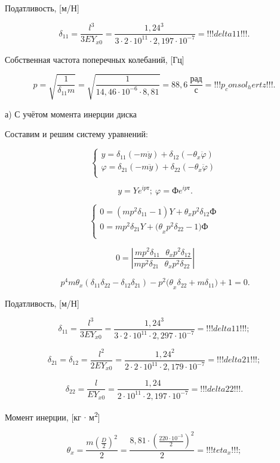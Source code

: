 Податливость, [м/Н]

\[\delta_{11} = \frac{l^{3}}{3EY_{x0}} = \frac{{1,24}^{3}\ }{3\cdot2\cdot10^{11}\cdot2,197\cdot10^{- 7}} = !!!delta11!!!.\ \]

Собственная частота поперечных колебаний, [Гц]

\[p = \sqrt{\frac{1}{\delta_{11}m}} = \sqrt{\frac{1}{14,46\cdot10^{- 6}\cdot8,81}} = 88,6\ \frac{рад}{с} = !!!p_consol_hertz!!!.\ \]

а) С учётом момента инерции диска

Составим и решим систему уравнений:

\[\left\{ \begin{matrix}
y = \delta_{11}\left( - m\ddot{y} \right) + \delta_{12}( - \theta_{x}\ddot{\varphi}) \\
\varphi = \delta_{21}\left( - m\ddot{y} \right) + \delta_{22}( - \theta_{x}\ddot{\varphi}) \\
\end{matrix} \right.\ \]

\[y = Ye^{\textit{ipт}};\ \varphi = Фe^{\textit{ipт}}.\]

\[\left\{ 
\begin{matrix}
0 = \left( mp^{2}\delta_{11} - 1 \right)Y + \theta_{x}p^{2}\delta_{12}Ф \\
0 = mp^{2}\delta_{21}Y + {(\theta}_{x}p^{2}\delta_{22} - 1)Ф \\
\end{matrix} 
\right.\ \]

\[0 = \left| \frac{mp^{2}\delta_{11}\textit{\ \ \ \ }\theta_{x}p^{2}\delta_{12}}{mp^{2}\delta_{21}\textit{\ \ \ }\theta_{x}p^{2}\delta_{22}\ } \right|\]

\[p^{4}m\theta_{x}\left( \delta_{11}\delta_{22} - \delta_{12}\delta_{21} \right) - p^{2}{(\theta}_{x}\delta_{22} + m\delta_{11}) + 1 = 0.\]

Податливость, [м/Н]

\[\delta_{11} = \frac{l^{3}}{3EY_{x0}} = \frac{{1,24}^{3}}{3\cdot2\cdot10^{11}\cdot2,297\cdot10^{- 7}} = !!!delta11!!!;\ \]


\[\delta_{21} = \delta_{12} = \frac{l^{2}}{2EY_{x0}} = \frac{{1,24}^{2}}{2\cdot2\cdot10^{11}\cdot2,179\cdot10^{- 7}} = !!!delta21!!!;\ \]


\[\delta_{22} = \frac{l}{EY_{x0}} = \frac{1,24}{2\cdot10^{11}\cdot2,197\cdot10^{- 7}} = !!!delta22!!!.\ \]

Момент инерции, [кг $\cdot$ м\textsuperscript{2}]

\[\theta_{x} = \frac{m\left( \frac{D}{2} \right)^{2}}{2} = \frac{8,81\cdot\left( \frac{220\cdot10^{- 3}}{2} \right)^{2}}{2} = !!!teta_x!!!;\ \]

